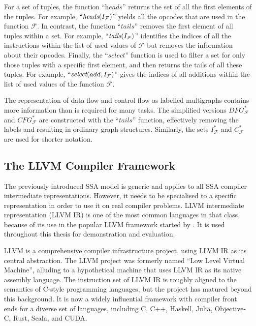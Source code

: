     For a set of tuples, the function ``$\textit{heads}$'' returns the set of
    all the first elements of the tuples.
    For example, $``\textit{heads}(I_\mathcal F)$'' yields all the opcodes that
    are used in the function $\mathcal F$.
    In contrast, the function ``$\textit{tails}$'' removes the first element of
    all tuples within a set.
    For example, $``\textit{tails}(I_\mathcal F)$'' identifies the indices of
    all the instructions within the list of used values of $\mathcal F$ but
    removes the information about their opcodes.
    Finally, the ``$\textit{select}$'' function is used to filter a set for only
    those tuples with a specific first element, and then returns the tails of
    all these tuples.
    For example, $``\textit{select}(add,I_\mathcal F)$'' gives the indices of
    all additions within the list of used values of the function $\mathcal F$.

    The representation of data flow and control flow as labelled multigraphs
    contains more information than is required for many tasks.
    The simplified versions $DFG_\mathcal F^*$ and $CFG_\mathcal F^*$ are
    constructed with the ``$\textit{tails}$'' function, effectively removing the
    labels and resulting in ordinary graph structures.
    Similarly, the sets $I_\mathcal F^*$ and $C_\mathcal F^*$ are used for
    shorter notation.

\subsection{The LLVM Compiler Framework}

    The previously introduced SSA model is generic and applies to all SSA
    compiler intermediate representations.
    However, it needs to be specialised to a specific representation in
    order to use it on real compiler problems.
    LLVM intermediate representation (LLVM IR) is one of the most common
    languages in that class, because of its use in the popular LLVM
    framework started by \citet{lattner2004llvm}.
    It is used throughout this thesis for demonstration and evaluation.

    LLVM is a comprehensive compiler infrastructure project, using LLVM IR as
    its central abstraction.
    The LLVM project was formerly named ``Low Level Virtual Machine'',
    alluding to a hypothetical machine that uses LLVM IR as its native assembly
    language.
    The instruction set of LLVM IR is roughly aligned to the semantics of
    C-style programming languages, but the project has matured beyond this
    background.
    It is now a widely influential framework with compiler front ends
    for a diverse set of languages, including C, C++, Haskell, Julia,
    Objective-C, Rust, Scala, and CUDA.

